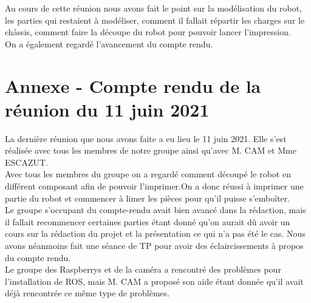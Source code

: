 \documentclass{PackagerQualityN}
\begin{document}
Au cours de cette réunion nous avons fait le point sur la modélisation du robot, les parties qui restaient à modéliser, comment il fallait répartir les charges sur le châssis, comment faire la découpe du robot pour pouvoir lancer l'impression. \\

On a également regardé l'avancement du compte rendu.

\newp
\section*{Annexe - Compte rendu de la réunion du 11 juin 2021}
La dernière réunion que nous avons faite a eu lieu le 11 juin 2021. Elle s'est réalisée avec tous les membres de notre groupe ainsi qu'avec M. CAM et Mme ESCAZUT.\\ 

Avec tous les membres du groupe on a regardé comment découpé le robot en différent composant afin de pouvoir l'imprimer.On a donc réussi à imprimer une partie du robot et commencer à limer les pièces pour qu'il puisse s'emboîter.\\

Le groupe s'occupant du compte-rendu avait bien avancé dans la rédaction, mais il fallait recommencer certaines parties étant donné qu'on aurait dû avoir un cours sur la rédaction du projet et la présentation ce qui n'a pas été le cas. Nous avons néanmoins  fait une séance de TP pour avoir des éclaircissements à propos du compte rendu.\\

Le groupe des Raspberrys et de la caméra a rencontré des problèmes pour l'installation de ROS, mais M. CAM a proposé son aide étant donnée qu'il avait déjà rencontrée ce même type de problèmes.




\newp       %

\listoffigures

\newp



\citep{lienLogicielCamera} 
\citep{lienRoue} 
\citep{buck} 
\citep{lienLogicielCamera}
\citep{distribRos}
\citep{buck}
\citep{videoGraven}
\citep{lienRegulateur}
\citep{lienResistance}
\citep{commandeCluster}
\citep{explicationRos}
\citep{decoupePlaque}
\end{document}
